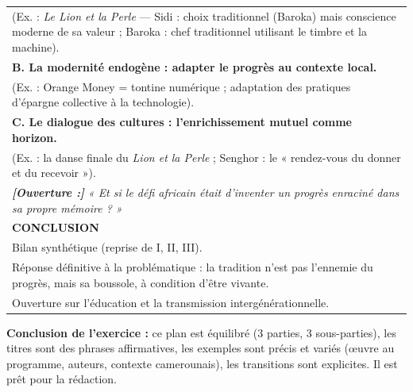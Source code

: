 \documentclass[11pt]{article}
\begin{document}
\begin{exoresolu}
\begin{center}
\begin{tabularx}{\linewidth}{|X|}
\hspace{1cm} (Ex. : \emph{Le Lion et la Perle} — Sidi : choix traditionnel (Baroka) mais conscience moderne de sa valeur ; Baroka : chef traditionnel utilisant le timbre et la machine). \\
\hspace{0.5cm} \textbf{B. La modernité endogène : adapter le progrès au contexte local.} \\
\hspace{1cm} (Ex. : Orange Money = tontine numérique ; adaptation des pratiques d'épargne collective à la technologie). \\
\hspace{0.5cm} \textbf{C. Le dialogue des cultures : l'enrichissement mutuel comme horizon.} \\
\hspace{1cm} (Ex. : la danse finale du \emph{Lion et la Perle} ; Senghor : le « rendez-vous du donner et du recevoir »). \\
\hspace{0.5cm} \textit{\textbf{[Ouverture :]}} \emph{« Et si le défi africain était d'inventer un progrès enraciné dans sa propre mémoire ? »} \\ \hline
\textbf{CONCLUSION} \\
\hspace{0.5cm} Bilan synthétique (reprise de I, II, III). \\
\hspace{0.5cm} Réponse définitive à la problématique : la tradition n'est pas l'ennemie du progrès, mais sa boussole, à condition d'être vivante. \\
\hspace{0.5cm} Ouverture sur l'éducation et la transmission intergénérationnelle. \\ \hline
\end{tabularx}
\end{center}

\textbf{Conclusion de l'exercice :} ce plan est équilibré (3 parties, 3 sous-parties), les titres sont des phrases affirmatives, les exemples sont précis et variés (œuvre au programme, auteurs, contexte camerounais), les transitions sont explicites. Il est prêt pour la rédaction.
\end{exoresolu}
\end{document}
